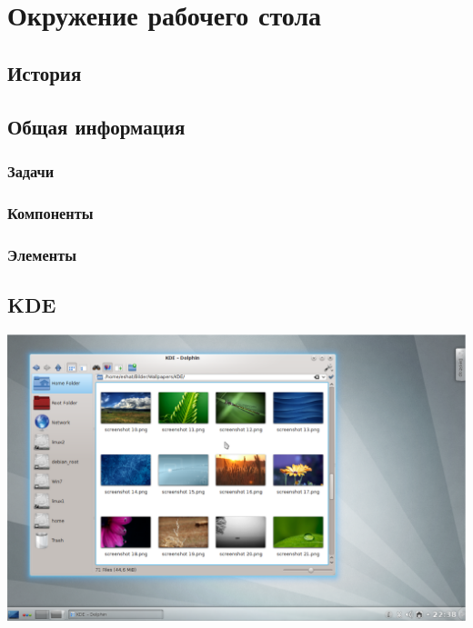 \section{Окружение рабочего стола}\label{base:software:de}
\subsection{История}\label{base:software:de:history}
\subsection{Общая информация}\label{base:software:de:info}
\subsubsection{Задачи}\label{base:software:de:info:tasks}
\subsubsection{Компоненты}\label{base:software:de:info:components}
\subsubsection{Элементы}\label{base:software:de:info:elements}
\subsection{KDE}\label{base:software:de:kde}
\includegraphics[scale=0.38]{base/Software/KDE1.eps}

